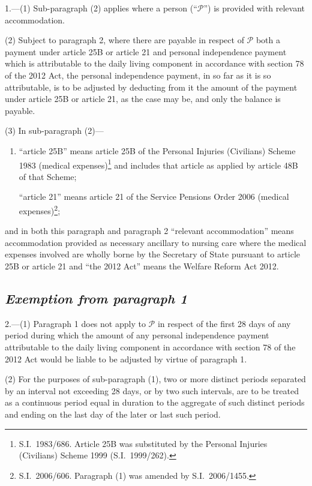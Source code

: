 \documentclass[12pt,a4paper]{article}
\begin{document}
1.—(1) Sub-paragraph (2) applies where a person (“$\mathcal{P}$”) is provided with relevant accommodation.

(2) Subject to paragraph 2, where there are payable in respect of $\mathcal{P}$ both a payment under article 25B or article 21 and personal independence payment which is attributable to the daily living component in accordance with section 78 of the 2012 Act, the personal independence payment, in so far as it is so attributable, is to be adjusted by deducting from it the amount of the payment under article 25B or article 21, as the case may be, and only the balance is payable.

(3) In sub-paragraph (2)—
\begin{enumerate}\item[]
“article 25B” means article 25B of the Personal Injuries (Civilians) Scheme 1983 (medical expenses)\footnote{S.I.~1983/686. Article 25B was substituted by the Personal Injuries (Civilians) Scheme 1999 (S.I.~1999/262).} and includes that article as applied by article 48B of that Scheme;

“article 21” means article 21 of the Service Pensions Order 2006 (medical expenses)\footnote{S.I.~2006/606. Paragraph (1) was amended by S.I.~2006/1455.};
\end{enumerate}
and in both this paragraph and paragraph 2 “relevant accommodation” means accommodation provided as necessary ancillary to nursing care where the medical expenses involved are wholly borne by the Secretary of State pursuant to article 25B or article 21 and “the 2012 Act” means the Welfare Reform Act 2012.

\subsection*{\itshape Exemption from paragraph 1}

2.—(1) Paragraph 1 does not apply to $\mathcal{P}$ in respect of the first 28 days of any period during which the amount of any personal independence payment attributable to the daily living component in accordance with section 78 of the 2012 Act would be liable to be adjusted by virtue of paragraph 1.

(2) For the purposes of sub-paragraph (1), two or more distinct periods separated by an interval not exceeding 28 days, or by two such intervals, are to be treated as a continuous period equal in duration to the aggregate of such distinct periods and ending on the last day of the later or last such period.
\end{document}
